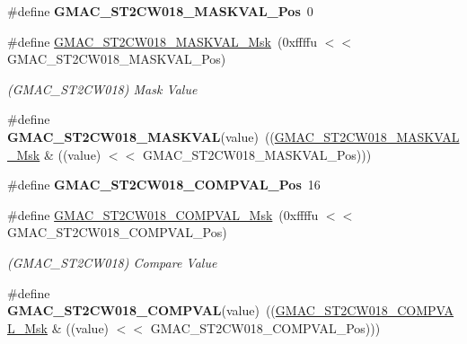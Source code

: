 \begin{DoxyCompactItemize}
\#define {\bfseries G\+M\+A\+C\+\_\+\+S\+T2\+C\+W018\+\_\+\+M\+A\+S\+K\+V\+A\+L\+\_\+\+Pos}~0
\item 
\mbox{\label{group__SAME70__GMAC_gaf61e5a14c295aaf1404cb2015d3a06be}} 
\#define \mbox{\hyperlink{group__SAME70__GMAC_gaf61e5a14c295aaf1404cb2015d3a06be}{G\+M\+A\+C\+\_\+\+S\+T2\+C\+W018\+\_\+\+M\+A\+S\+K\+V\+A\+L\+\_\+\+Msk}}~(0xffffu $<$$<$ G\+M\+A\+C\+\_\+\+S\+T2\+C\+W018\+\_\+\+M\+A\+S\+K\+V\+A\+L\+\_\+\+Pos)
\begin{DoxyCompactList}\small\item\em (G\+M\+A\+C\+\_\+\+S\+T2\+C\+W018) Mask Value \end{DoxyCompactList}\item 
\mbox{\label{group__SAME70__GMAC_ga937784c236e237d13f77b7c38dedcc6c}} 
\#define {\bfseries G\+M\+A\+C\+\_\+\+S\+T2\+C\+W018\+\_\+\+M\+A\+S\+K\+V\+AL}(value)~((\mbox{\hyperlink{group__SAMV71__GMAC_gaf61e5a14c295aaf1404cb2015d3a06be}{G\+M\+A\+C\+\_\+\+S\+T2\+C\+W018\+\_\+\+M\+A\+S\+K\+V\+A\+L\+\_\+\+Msk}} \& ((value) $<$$<$ G\+M\+A\+C\+\_\+\+S\+T2\+C\+W018\+\_\+\+M\+A\+S\+K\+V\+A\+L\+\_\+\+Pos)))
\item 
\mbox{\label{group__SAME70__GMAC_gac76d7795e2c40ac2c9f6c000e883be1a}} 
\#define {\bfseries G\+M\+A\+C\+\_\+\+S\+T2\+C\+W018\+\_\+\+C\+O\+M\+P\+V\+A\+L\+\_\+\+Pos}~16
\item 
\mbox{\label{group__SAME70__GMAC_gac6daf367bc315b3a480e977d305224af}} 
\#define \mbox{\hyperlink{group__SAME70__GMAC_gac6daf367bc315b3a480e977d305224af}{G\+M\+A\+C\+\_\+\+S\+T2\+C\+W018\+\_\+\+C\+O\+M\+P\+V\+A\+L\+\_\+\+Msk}}~(0xffffu $<$$<$ G\+M\+A\+C\+\_\+\+S\+T2\+C\+W018\+\_\+\+C\+O\+M\+P\+V\+A\+L\+\_\+\+Pos)
\begin{DoxyCompactList}\small\item\em (G\+M\+A\+C\+\_\+\+S\+T2\+C\+W018) Compare Value \end{DoxyCompactList}\item 
\mbox{\label{group__SAME70__GMAC_gaaa3c95b6a11000b60e96f44e9227b696}} 
\#define {\bfseries G\+M\+A\+C\+\_\+\+S\+T2\+C\+W018\+\_\+\+C\+O\+M\+P\+V\+AL}(value)~((\mbox{\hyperlink{group__SAMV71__GMAC_gac6daf367bc315b3a480e977d305224af}{G\+M\+A\+C\+\_\+\+S\+T2\+C\+W018\+\_\+\+C\+O\+M\+P\+V\+A\+L\+\_\+\+Msk}} \& ((value) $<$$<$ G\+M\+A\+C\+\_\+\+S\+T2\+C\+W018\+\_\+\+C\+O\+M\+P\+V\+A\+L\+\_\+\+Pos)))

\end{DoxyCompactItemize}
